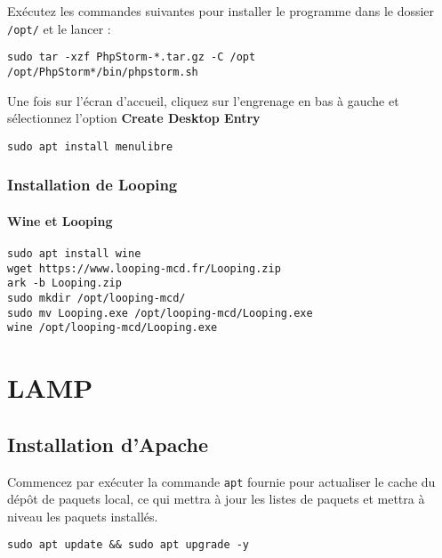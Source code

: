 Exécutez les commandes suivantes pour installer le programme dans  le dossier \texttt{/opt/} et le lancer :

\begin{lstlisting}
sudo tar -xzf PhpStorm-*.tar.gz -C /opt
/opt/PhpStorm*/bin/phpstorm.sh
\end{lstlisting}

Une fois sur l'écran d'accueil, cliquez sur l'engrenage en bas à gauche et sélectionnez l'option \textbf{Create Desktop Entry}

\begin{lstlisting}
sudo apt install menulibre
\end{lstlisting}

\subsection{Installation de Looping}

\subsubsection{Wine et Looping}

\begin{lstlisting}
sudo apt install wine
wget https://www.looping-mcd.fr/Looping.zip
ark -b Looping.zip
sudo mkdir /opt/looping-mcd/
sudo mv Looping.exe /opt/looping-mcd/Looping.exe
wine /opt/looping-mcd/Looping.exe
\end{lstlisting}

\subsubsection{}


\chapter{LAMP}

\section{Installation d'Apache}

Commencez par exécuter la commande \texttt{apt} fournie pour actualiser le cache du dépôt de paquets local, ce qui mettra à jour les listes de paquets et mettra à niveau les paquets installés.

\begin{lstlisting}
sudo apt update && sudo apt upgrade -y
\end{lstlisting}

